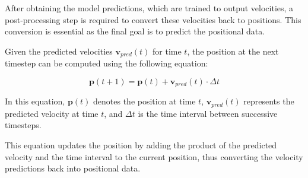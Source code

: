 After obtaining the model predictions, which are trained to output velocities, a post-processing step is required to convert these velocities back to positions. This conversion is essential as the final goal is to predict the positional data.

Given the predicted velocities \( \mathbf{v}_{pred}(t) \) for time \( t \), the position at the next timestep can be computed using the following equation:

\[
\mathbf{p}(t+1) = \mathbf{p}(t) + \mathbf{v}_{pred}(t) \cdot \Delta t
\]

In this equation, \( \mathbf{p}(t) \) denotes the position at time \( t \), \( \mathbf{v}_{pred}(t) \) represents the predicted velocity at time \( t \), and \( \Delta t \) is the time interval between successive timesteps.

This equation updates the position by adding the product of the predicted velocity and the time interval to the current position, thus converting the velocity predictions back into positional data.
